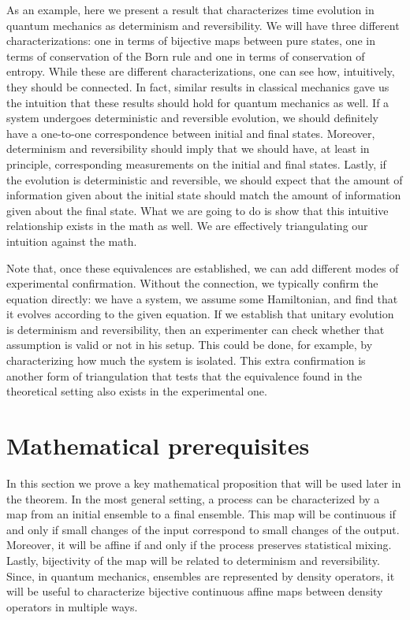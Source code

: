 \documentclass[entropy,article,submit,moreauthors]{Definitions/mdpi}
\begin{document}
As an example, here we present a result that characterizes time evolution in quantum mechanics as determinism and reversibility. We will have three different characterizations: one in terms of bijective maps between pure states, one in terms of conservation of the Born rule and one in terms of conservation of entropy. While these are different characterizations, one can see how, intuitively, they should be connected. In fact, similar results in classical mechanics gave us the intuition that these results should hold for quantum mechanics as well. If a system undergoes deterministic and reversible evolution, we should definitely have a one-to-one correspondence between initial and final states. Moreover, determinism and reversibility should imply that we should have, at least in principle, corresponding measurements on the initial and final states. Lastly, if the evolution is deterministic and reversible, we should expect that the amount of information given about the initial state should match the amount of information given about the final state. What we are going to do is show that this intuitive relationship exists in the math as well. We are effectively triangulating our intuition against the math.

Note that, once these equivalences are established, we can add different modes of experimental confirmation. Without the connection, we typically confirm the equation directly: we have a system, we assume some Hamiltonian, and find that it evolves according to the given equation. If we establish that unitary evolution is determinism and reversibility, then an experimenter can check whether that assumption is valid or not in his setup. This could be done, for example, by characterizing how much the system is isolated. This extra confirmation is another form of triangulation that tests that the equivalence found in the theoretical setting also exists in the experimental one.

\section{Mathematical prerequisites}

In this section we prove a key mathematical proposition that will be used later in the theorem. In the most general setting, a process can be characterized by a map from an initial ensemble to a final ensemble. This map will be continuous if and only if small changes of the input correspond to small changes of the output. Moreover, it will be affine if and only if the process preserves statistical mixing. Lastly, bijectivity of the map will be related to determinism and reversibility. Since, in quantum mechanics, ensembles are represented by density operators, it will be useful to characterize bijective continuous affine maps between density operators in multiple ways.
\end{document}
